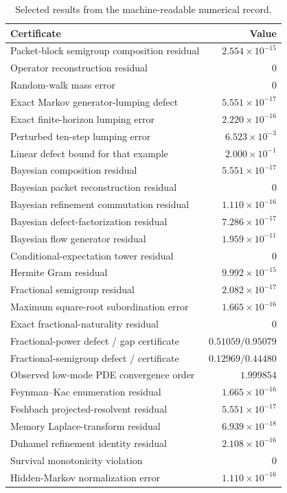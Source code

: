 \documentclass[11pt,a4paper]{article}
\theoremstyle{definition}
\theoremstyle{remark}
\begin{document}
\begin{table}[htbp]
\centering
\small
\begin{tabular}{L{0.56\textwidth} r}
\toprule
Certificate & Value\\
\midrule
Packet-block semigroup composition residual & $2.554\times10^{-15}$\\
Operator reconstruction residual & $0$\\
Random-walk mass error & $0$\\
Exact Markov generator-lumping defect & $5.551\times10^{-17}$\\
Exact finite-horizon lumping error & $2.220\times10^{-16}$\\
Perturbed ten-step lumping error & $6.523\times10^{-3}$\\
Linear defect bound for that example & $2.000\times10^{-1}$\\
Bayesian composition residual & $5.551\times10^{-17}$\\
Bayesian packet reconstruction residual & $0$\\
Bayesian refinement commutation residual & $1.110\times10^{-16}$\\
Bayesian defect-factorization residual & $7.286\times10^{-17}$\\
Bayesian flow generator residual & $1.959\times10^{-11}$\\
Conditional-expectation tower residual & $0$\\
Hermite Gram residual & $9.992\times10^{-15}$\\
Fractional semigroup residual & $2.082\times10^{-17}$\\
Maximum square-root subordination error & $1.665\times10^{-16}$\\
Exact fractional-naturality residual & $0$\\
Fractional-power defect / gap certificate & $0.51059 / 0.95079$\\
Fractional-semigroup defect / certificate & $0.12969 / 0.44480$\\
Observed low-mode PDE convergence order & $1.999854$\\
Feynman--Kac enumeration residual & $1.665\times10^{-16}$\\
Feshbach projected-resolvent residual & $5.551\times10^{-17}$\\
Memory Laplace-transform residual & $6.939\times10^{-18}$\\
Duhamel refinement identity residual & $2.108\times10^{-16}$\\
Survival monotonicity violation & $0$\\
Hidden-Markov normalization error & $1.110\times10^{-16}$\\
\bottomrule
\end{tabular}
\caption{Selected results from the machine-readable numerical record.}
\label{core:tab:numerics}
\end{table}
\end{document}
